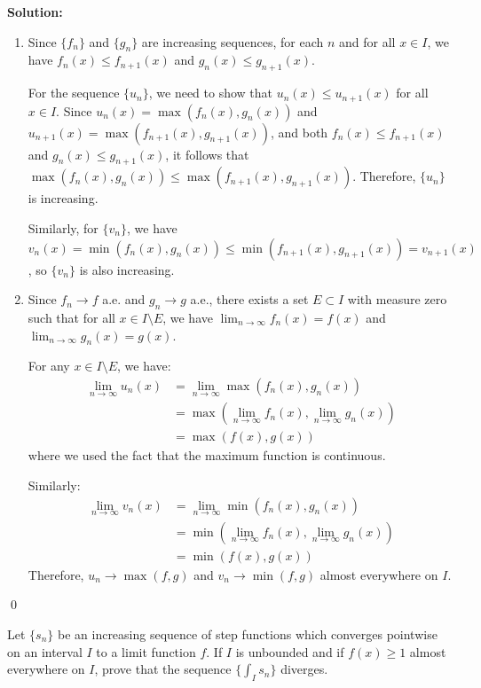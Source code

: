 \bigskip\noindent\textbf{Solution:}
\begin{enumerate}[label=(\alph*)]
\item Since $\{f_n\}$ and $\{g_n\}$ are increasing sequences, for each $n$ and for all $x \in I$, we have $f_n(x) \leq f_{n+1}(x)$ and $g_n(x) \leq g_{n+1}(x)$. 

For the sequence $\{u_n\}$, we need to show that $u_n(x) \leq u_{n+1}(x)$ for all $x \in I$. Since $u_n(x) = \max(f_n(x), g_n(x))$ and $u_{n+1}(x) = \max(f_{n+1}(x), g_{n+1}(x))$, and both $f_n(x) \leq f_{n+1}(x)$ and $g_n(x) \leq g_{n+1}(x)$, it follows that $\max(f_n(x), g_n(x)) \leq \max(f_{n+1}(x), g_{n+1}(x))$. Therefore, $\{u_n\}$ is increasing.

Similarly, for $\{v_n\}$, we have $v_n(x) = \min(f_n(x), g_n(x)) \leq \min(f_{n+1}(x), g_{n+1}(x)) = v_{n+1}(x)$, so $\{v_n\}$ is also increasing.

\item Since $f_n \to f$ a.e. and $g_n \to g$ a.e., there exists a set $E \subset I$ with measure zero such that for all $x \in I \setminus E$, we have $\lim_{n \to \infty} f_n(x) = f(x)$ and $\lim_{n \to \infty} g_n(x) = g(x)$.

For any $x \in I \setminus E$, we have:
\begin{align*}
\lim_{n \to \infty} u_n(x) &= \lim_{n \to \infty} \max(f_n(x), g_n(x)) \\
&= \max(\lim_{n \to \infty} f_n(x), \lim_{n \to \infty} g_n(x)) \\
&= \max(f(x), g(x))
\end{align*}
where we used the fact that the maximum function is continuous.

Similarly:
\begin{align*}
\lim_{n \to \infty} v_n(x) &= \lim_{n \to \infty} \min(f_n(x), g_n(x)) \\
&= \min(\lim_{n \to \infty} f_n(x), \lim_{n \to \infty} g_n(x)) \\
&= \min(f(x), g(x))
\end{align*}
Therefore, $u_n \to \max(f, g)$ and $v_n \to \min(f, g)$ almost everywhere on $I$.
\end{enumerate}\qed


\begin{problembox}
Let $\{s_n\}$ be an increasing sequence of step functions which converges pointwise on an interval $I$ to a limit function $f$. If $I$ is unbounded and if $f(x) \geq 1$ almost everywhere on $I$, prove that the sequence $\{\int_I s_n\}$ diverges.
\end{problembox}

